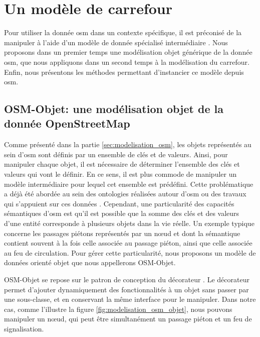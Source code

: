 \section{Un modèle de carrefour}

\label{sec:modelisation_crmodel}

Pour utiliser la donnée \gls{osm} dans un contexte spécifique, il est préconisé de la manipuler à l'aide d'un modèle de donnée spécialisé intermédiaire \citep{Touya2014}. Nous proposons dans un premier temps une modélisation objet générique de la donnée \gls{osm}, que nous appliquons dans un second temps à la modélisation du carrefour. Enfin, nous présentons les méthodes permettant d'instancier ce modèle depuis \gls{osm}.

\subsection{OSM-Objet: une modélisation objet de la donnée OpenStreetMap}

Comme présenté dans la partie \ref{sec:modelisation_osm}, les objets représentés au sein d'\gls{osm} sont définis par un ensemble de clés et de valeurs. Ainsi, pour manipuler chaque objet, il est nécessaire de déterminer l'ensemble des clés et valeurs qui vont le définir. En ce sens, il est plus commode de manipuler un modèle intermédiaire pour lequel cet ensemble est prédéfini. Cette problématique a déjà été abordée au sein des ontologies réalisées autour d'\gls{osm} \citep{Codescu2011,Hombiat2017} ou des travaux qui s'appuient sur ces données \citep{Touya2014}. Cependant, une particularité des capacités sémantiques d'\gls{osm} est qu'il est possible que la somme des clés et des valeurs d'une entité corresponde à plusieurs objets dans la vie réelle. Un exemple typique concerne les passages piétons représentés par un nœud et dont la sémantique contient souvent à la fois celle associée au passage piéton, ainsi que celle associée au feu de circulation. Pour gérer cette particularité, nous proposons un modèle de données orienté objet que nous appellerons OSM-Objet.

\newpar{}

OSM-Objet se repose sur le patron de conception du décorateur \citep{Gamma1994a}. Le décorateur permet d'ajouter dynamiquement des fonctionnalités à un objet sans passer par une sous-classe, et en conservant la même interface pour le manipuler. Dans notre cas, comme l'illustre la figure \ref{fig:modelisation_osm_objet}, nous pouvons manipuler un nœud, qui peut être simultanément un passage piéton et un feu de signalisation.

